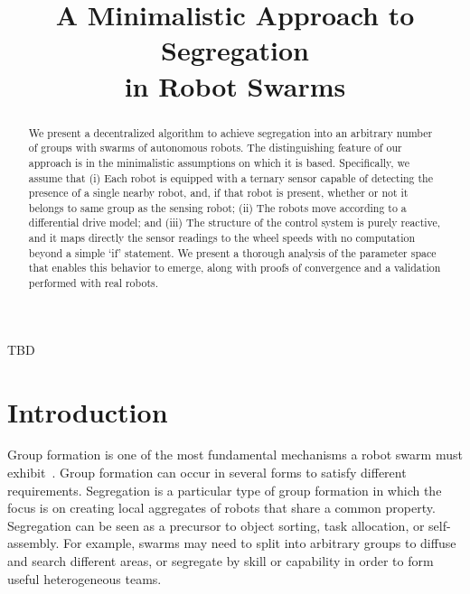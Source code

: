 \documentclass[conference]{IEEEtran}
\begin{document}
\title{A Minimalistic Approach to Segregation\\
  in Robot Swarms}

\author{
}

\maketitle

\begin{abstract}
  We present a decentralized algorithm to achieve segregation into an
  arbitrary number of groups with swarms of autonomous robots. The
  distinguishing feature of our approach is in the minimalistic
  assumptions on which it is based. Specifically, we assume that (i)
  Each robot is equipped with a ternary sensor capable of detecting
  the presence of a single nearby robot, and, if that robot is
  present, whether or not it belongs to same group as the sensing
  robot; (ii) The robots move according to a differential drive model;
  and (iii) The structure of the control system is purely reactive,
  and it maps directly the sensor readings to the wheel speeds with no
  computation beyond a simple `if' statement. We present a thorough
  analysis of the parameter space that enables this behavior to
  emerge, along with proofs of convergence and a validation performed
  with real robots.
\end{abstract}

\begin{IEEEkeywords}
  TBD
\end{IEEEkeywords}

\section{Introduction}

Group formation is one of the most fundamental mechanisms a robot swarm must
exhibit~\cite{}. Group formation can occur in several forms to satisfy different
requirements. Segregation is a particular type of group formation in which the
focus is on creating local aggregates of robots that share a common
property. Segregation can be seen as a precursor to object sorting, task
allocation, or self-assembly. For example, swarms may need to split into
arbitrary groups to diffuse and search different areas, or segregate by skill or
capability in order to form useful heterogeneous teams.
\end{document}
